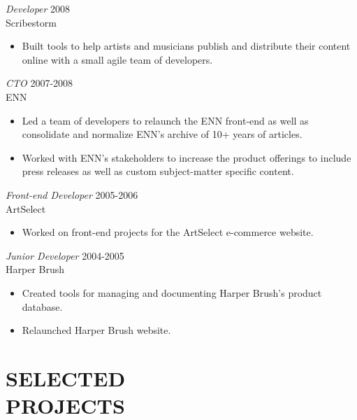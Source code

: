 \documentclass[line,margin]{res}
\begin{document}
\begin{resume}
    \begin{samepage}
    {\sl Developer}
    \hfill 2008 \\
    Scribestorm
    \begin{itemize} \itemsep -2pt
        \item
            Built tools to help artists and musicians publish and distribute
            their content online with a small agile team of developers.

    \end{itemize}
    \end{samepage}

    {\sl CTO}
    \hfill 2007-2008 \\
    ENN
    \begin{itemize} \itemsep -2pt
        \item
            Led a team of developers to relaunch the ENN front-end as well as
            consolidate and normalize ENN's archive of 10+ years of articles.

        \item
            Worked with ENN's stakeholders to increase the product offerings
            to include press releases as well as custom subject-matter
            specific content.

    \end{itemize}

    {\sl Front-end Developer}
    \hfill 2005-2006 \\
    ArtSelect
    \begin{itemize} \itemsep -2pt
        \item
            Worked on front-end projects for the ArtSelect e-commerce website.

    \end{itemize}

    {\sl Junior Developer}
    \hfill 2004-2005 \\
    Harper Brush
    \begin{itemize} \itemsep -2pt
        \item
            Created tools for managing and documenting Harper Brush's product
            database.

        \item
            Relaunched Harper Brush website.

    \end{itemize}



\section{SELECTED \\ PROJECTS}


\end{resume}
\end{document}
